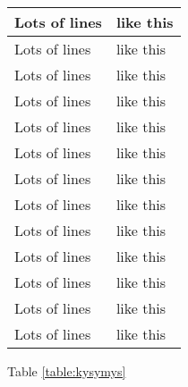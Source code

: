\begin{longtable}[l]{| p{40mm} | p{105mm} |}
    \hline
    Lots of lines & like this\\
    \hline
    Lots of lines & like this\\
    \hline
    Lots of lines & like this\\
    \hline
    Lots of lines & like this\\
    \hline
    Lots of lines & like this\\
    \hline
    Lots of lines & like this\\
    \hline
    Lots of lines & like this\\
    \hline
    Lots of lines & like this\\
    \hline
    Lots of lines & like this\\
    \hline
    Lots of lines & like this\\
    \hline
    Lots of lines & like this\\
    \hline
    Lots of lines & like this\\
    \hline
    Lots of lines & like this\\
    \hline
\end{longtable}

Table \ref{table:kysymys}